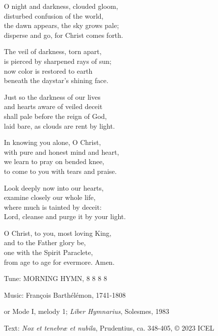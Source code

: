\hymn

\begin{hymnverse}
O night and darkness, clouded gloom,\\
disturbed confusion of the world,\\
the dawn appears, the sky grows pale;\\
disperse and go, for Christ comes forth.

The veil of darkness, torn apart,\\
is pierced by sharpened rays of sun;\\
now color is restored to earth\\
beneath the daystar’s shining face.

Just so the darkness of our lives\\
and hearts aware of veiled deceit\\
shall pale before the reign of God,\\
laid bare, as clouds are rent by light.

In knowing you alone, O Christ,\\
with pure and honest mind and heart,\\
we learn to pray on bended knee,\\
to come to you with tears and praise.

Look deeply now into our hearts,\\
examine closely our whole life,\\
where much is tainted by deceit:\\
Lord, cleanse and purge it by your light.

O Christ, to you, most loving King,\\
and to the Father glory be,\\
one with the Spirit Paraclete,\\
from age to age for evermore. Amen.
\end{hymnverse}

\begin{hymnsource}
Tune: MORNING HYMN, 8 8 8 8

Music: François Barthélémon, 1741-1808

or Mode I, melody 1; \emph{Liber Hymnarius}, Solesmes, 1983

Text: \emph{Nox et tenebræ et nubila}, Prudentius, ca. 348-405, © 2023 ICEL
\end{hymnsource}
